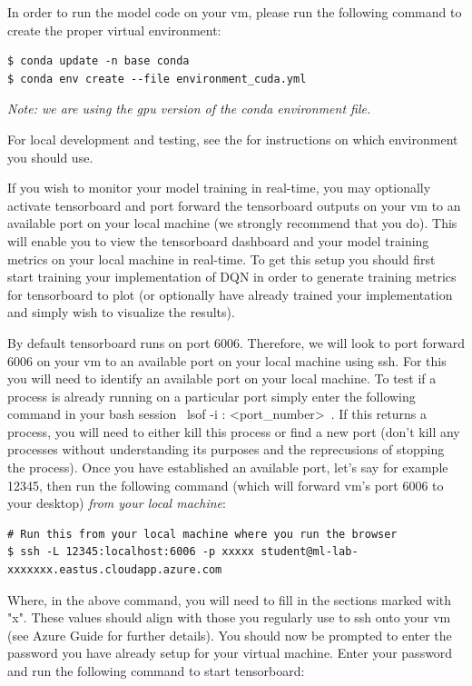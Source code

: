 In order to run the model code on your vm, please run the following command to create the proper virtual environment:

\begin{lstlisting}
$ conda update -n base conda
$ conda env create --file environment_cuda.yml
\end{lstlisting}

\textit{Note: we are using the gpu version of the conda environment file.}

For local development and testing, see the  for instructions on which environment you should use.

If you wish to monitor your model training in real-time, you may optionally activate tensorboard and port forward the tensorboard outputs on your vm to an available port on your local machine (we strongly recommend that you do). This will enable you to view the tensorboard dashboard and your model training metrics on your local machine in real-time. To get this setup you should first start training your implementation of DQN in order to generate training metrics for tensorboard to plot (or optionally have already trained your implementation and simply wish to visualize the results).

By default tensorboard runs on port 6006. Therefore, we will look to port forward 6006 on your vm to an available port on your local machine using ssh. For this you will need to identify an available port on your local machine. To test if a process is already running on a particular port simply enter the following command in your bash session ~lsof -i : <port_number>~. If this returns a process, you will need to either kill this process or find a new port (don't kill any processes without understanding its purposes and the reprecusions of stopping the process). Once you have established an available port, let's say for example 12345, then run the following command (which will forward vm's port 6006 to your desktop) \textit{from your local machine}:

\begin{lstlisting}
# Run this from your local machine where you run the browser
$ ssh -L 12345:localhost:6006 -p xxxxx student@ml-lab-xxxxxxx.eastus.cloudapp.azure.com
\end{lstlisting}

Where, in the above command, you will need to fill in the sections marked with "x". These values should align with those you regularly use to ssh onto your vm (see Azure Guide for further details). You should now be prompted to enter the password you have already setup for your virtual machine. Enter your password and run the following command to start tensorboard:


